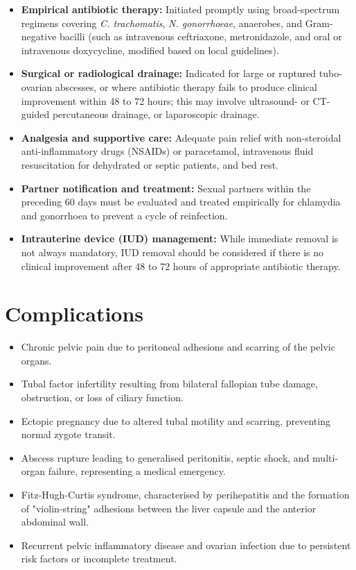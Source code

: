 \begin{itemize}
    \item \textbf{Empirical antibiotic therapy:} Initiated promptly using broad-spectrum regimens covering \textit{C. trachomatis}, \textit{N. gonorrhoeae}, anaerobes, and Gram-negative bacilli (such as intravenous ceftriaxone, metronidazole, and oral or intravenous doxycycline, modified based on local guidelines).
    \item \textbf{Surgical or radiological drainage:} Indicated for large or ruptured tubo-ovarian abscesses, or where antibiotic therapy fails to produce clinical improvement within 48 to 72 hours; this may involve ultrasound- or CT-guided percutaneous drainage, or laparoscopic drainage.
    \item \textbf{Analgesia and supportive care:} Adequate pain relief with non-steroidal anti-inflammatory drugs (NSAIDs) or paracetamol, intravenous fluid resuscitation for dehydrated or septic patients, and bed rest.
    \item \textbf{Partner notification and treatment:} Sexual partners within the preceding 60 days must be evaluated and treated empirically for chlamydia and gonorrhoea to prevent a cycle of reinfection.
    \item \textbf{Intrauterine device (IUD) management:} While immediate removal is not always mandatory, IUD removal should be considered if there is no clinical improvement after 48 to 72 hours of appropriate antibiotic therapy.
\end{itemize}

\section*{Complications}
\begin{itemize}
    \item Chronic pelvic pain due to peritoneal adhesions and scarring of the pelvic organs.
    \item Tubal factor infertility resulting from bilateral fallopian tube damage, obstruction, or loss of ciliary function.
    \item Ectopic pregnancy due to altered tubal motility and scarring, preventing normal zygote transit.
    \item Abscess rupture leading to generalised peritonitis, septic shock, and multi-organ failure, representing a medical emergency.
    \item Fitz-Hugh-Curtis syndrome, characterised by perihepatitis and the formation of "violin-string" adhesions between the liver capsule and the anterior abdominal wall.
    \item Recurrent pelvic inflammatory disease and ovarian infection due to persistent risk factors or incomplete treatment.
\end{itemize}

